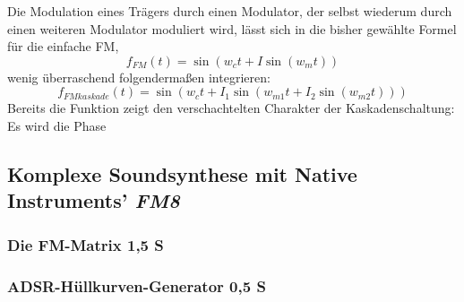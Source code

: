 Die Modulation eines Trägers durch einen Modulator, der selbst wiederum durch einen weiteren Modulator moduliert wird, lässt sich in die bisher gewählte Formel für die einfache FM,
\begin{equation}
f_{FM}(t) = \sin(w_ct + I\sin(w_mt))
\end{equation}
wenig überraschend folgendermaßen integrieren:
\begin{equation}
f_{FMkaskade}(t) = \sin(w_ct + I_1\sin(w_{m1}t + I_2\sin(w_{m2}t)))
\end{equation}
Bereits die Funktion zeigt den verschachtelten Charakter der Kaskadenschaltung: Es wird die Phase 

\subsection{Komplexe Soundsynthese mit Native Instruments' \textit{FM8}}

\subsubsection{Die FM-Matrix 1,5 S}


\subsubsection{ADSR-Hüllkurven-Generator 0,5 S}
\